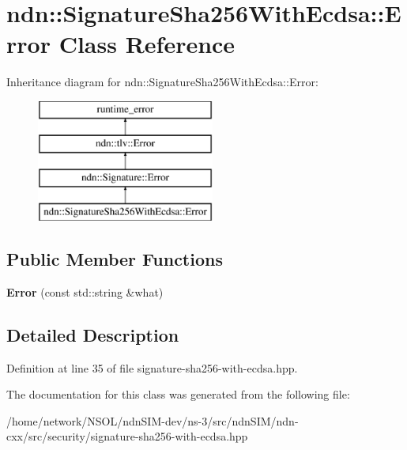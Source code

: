 \hypertarget{classndn_1_1SignatureSha256WithEcdsa_1_1Error}{}\section{ndn\+:\+:Signature\+Sha256\+With\+Ecdsa\+:\+:Error Class Reference}
\label{classndn_1_1SignatureSha256WithEcdsa_1_1Error}
Inheritance diagram for ndn\+:\+:Signature\+Sha256\+With\+Ecdsa\+:\+:Error\+:\begin{figure}[H]
\begin{center}
\leavevmode
\includegraphics[height=4.000000cm]{classndn_1_1SignatureSha256WithEcdsa_1_1Error}
\end{center}
\end{figure}
\subsection*{Public Member Functions}
\begin{DoxyCompactItemize}
\item 
{\bfseries Error} (const std\+::string \&what)\hypertarget{classndn_1_1SignatureSha256WithEcdsa_1_1Error_a8719d26e01bf6df9ebb59bb03a3f58b0}{}\label{classndn_1_1SignatureSha256WithEcdsa_1_1Error_a8719d26e01bf6df9ebb59bb03a3f58b0}

\end{DoxyCompactItemize}


\subsection{Detailed Description}


Definition at line 35 of file signature-\/sha256-\/with-\/ecdsa.\+hpp.



The documentation for this class was generated from the following file\+:\begin{DoxyCompactItemize}
\item 
/home/network/\+N\+S\+O\+L/ndn\+S\+I\+M-\/dev/ns-\/3/src/ndn\+S\+I\+M/ndn-\/cxx/src/security/signature-\/sha256-\/with-\/ecdsa.\+hpp\end{DoxyCompactItemize}
